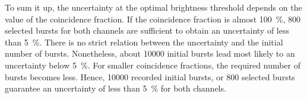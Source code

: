 To sum it up, the uncertainty at the optimal brightness threshold depends on the value of the coincidence fraction. If the coincidence fraction is almost \SI{100}{\percent}, \num{800} selected bursts for both channels are sufficient to obtain an uncertainty of less than \SI{5}{\percent}. There is no strict relation between the uncertainty and the initial number of bursts. Nonetheless, about \num{10000} initial bursts lead most likely to an uncertainty below \SI{5}{\percent}. For smaller coincidence fractions, the required number of bursts becomes less. Hence, \num{10000} recorded initial bursts, or \num{800} selected bursts guarantee an uncertainty of less than \SI{5}{\percent} for both channels.